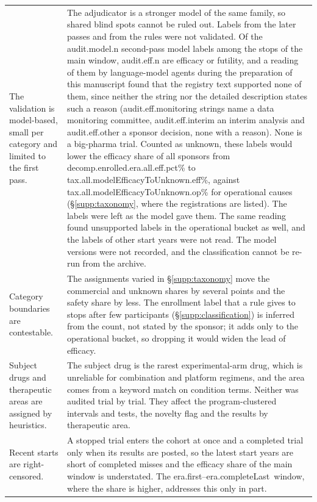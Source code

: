 \documentclass[11pt]{article}
\newcommand{\eracomplete}{\num{era.first}--\num{era.completeLast}}
\begin{document}
\begin{longtable}{>{\raggedright\arraybackslash}p{}>{\raggedright\arraybackslash}p{}}
The validation is model-based, small per category and limited to the first pass. & The adjudicator is a stronger model of the same family, so shared blind spots cannot be ruled out. Labels from the later passes and from the rules were not validated. Of the \num{audit.model.n} second-pass model labels among the stops of the main window, \num{audit.eff.n} are efficacy or futility, and a reading of them by language-model agents during the preparation of this manuscript found that the registry text supported none of them, since neither the string nor the detailed description states such a reason (\num{audit.eff.monitoring} strings name a data monitoring committee, \num{audit.eff.interim} an interim analysis and \num{audit.eff.other} a sponsor decision, none with a reason). None is a big-pharma trial. Counted as unknown, these labels would lower the efficacy share of all sponsors from \num{decomp.enrolled.era.all.eff.pct}\% to \num{tax.all.modelEfficacyToUnknown.eff}\%, against \num{tax.all.modelEfficacyToUnknown.op}\% for operational causes (\S\ref{supp:taxonomy}, where the registrations are listed). The labels were left as the model gave them. The same reading found unsupported labels in the operational bucket as well, and the labels of other start years were not read. The model versions were not recorded, and the classification cannot be re-run from the archive. \\
\addlinespace
Category boundaries are contestable. & The assignments varied in \S\ref{supp:taxonomy} move the commercial and unknown shares by several points and the safety share by less. The enrollment label that a rule gives to stops after few participants (\S\ref{supp:classification}) is inferred from the count, not stated by the sponsor; it adds only to the operational bucket, so dropping it would widen the lead of efficacy. \\
\addlinespace
Subject drugs and therapeutic areas are assigned by heuristics. & The subject drug is the rarest experimental-arm drug, which is unreliable for combination and platform regimens, and the area comes from a keyword match on condition terms. Neither was audited trial by trial. They affect the program-clustered intervals and tests, the novelty flag and the results by therapeutic area. \\
\addlinespace
Recent starts are right-censored. & A stopped trial enters the cohort at once and a completed trial only when its results are posted, so the latest start years are short of completed misses and the efficacy share of the main window is understated. The \eracomplete\ window, where the share is higher, addresses this only in part. \\

\end{longtable}
\end{document}
